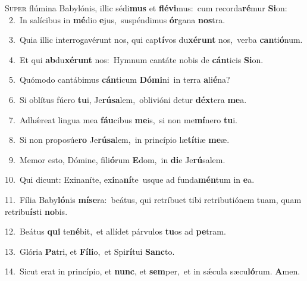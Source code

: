 \lettrine{\initial\textcolor{\initialcolor}{S}}{uper} flúmina Babylónis, illic sédi\textbf{mus} et \textbf{flé}\-\textbf{vi}mus:~\star cum recorda\-\textbf{ré}\-mur \textbf{Si}\-on:\\
{\numbfont\textcolor{\numbcolor}{~2.}}~In salícibus in \textbf{mé}\-dio \textbf{e}\-jus,~\star suspéndimus \textbf{ór}\-gana \textbf{nos}\-tra.\par
{\numbfont\textcolor{\numbcolor}{~3.}}~Quia illic interrogavérunt nos, qui cap\-\textbf{tí}\-vos du\-\textbf{xé}\-\textbf{runt} nos,~\star verba \textbf{can}\-ti\-\textbf{ó}\-num.\par
{\numbfont\textcolor{\numbcolor}{~4.}}~Et qui \textbf{ab}\-du\-\textbf{xé}\-\textbf{runt} nos:~\star Hymnum cantáte nobis de \textbf{cán}\-ticis \textbf{Si}\-on.\par
{\numbfont\textcolor{\numbcolor}{~5.}}~Quómodo cantábimus \textbf{cán}\-ticum \textbf{Dó}\-\textbf{mi}ni~\star in terra \textbf{a}\-li\-\textbf{é}\-na?\par
{\numbfont\textcolor{\numbcolor}{~6.}}~Si oblítus fúero \textbf{tu}\-i, Je\-\textbf{rú}\-\textbf{sa}lem,~\star oblivióni detur \textbf{déx}\-tera \textbf{me}\-a.\par
{\numbfont\textcolor{\numbcolor}{~7.}}~Adhǽreat lingua mea \textbf{fáu}\-cibus \textbf{me}\-is,~\star si non me\-\textbf{mí}\-nero \textbf{tu}\-i.\par
{\numbfont\textcolor{\numbcolor}{~8.}}~Si non proposúe\textbf{ro} Je\-\textbf{rú}\-\textbf{sa}lem,~\star in princípio læ\-\textbf{tí}\-tiæ \textbf{me}\-æ.\par
{\numbfont\textcolor{\numbcolor}{~9.}}~Memor esto, Dómine, fili\-\textbf{ó}\-rum \textbf{E}\-dom,~\star in \textbf{di}\-e Je\-\textbf{rú}\-salem.\par
{\numbfont\textcolor{\numbcolor}{10.}}~Qui dicunt: Exinaníte, ex\-\textbf{i}\-na\-\textbf{ní}\-te~\star usque ad funda\-\textbf{mén}\-tum in \textbf{e}\-a.\par
{\numbfont\textcolor{\numbcolor}{11.}}~Fília Baby\-\textbf{ló}\-nis \textbf{mí}\-\textbf{se}ra:~\star beátus, qui retríbuet tibi retributiónem tuam, quam retribu\-\textbf{ís}\-ti \textbf{no}\-bis.\par
{\numbfont\textcolor{\numbcolor}{12.}}~Beátus \textbf{qui} te\-\textbf{né}\-bit,~\star et allídet párvulos \textbf{tu}\-os ad \textbf{pe}\-tram.\par
{\numbfont\textcolor{\numbcolor}{13.}}~Glória \textbf{Pa}\-tri, et \textbf{Fí}\-\textbf{li}o,~\star et Spi\-\textbf{rí}\-tui \textbf{Sanc}\-to.\par
{\numbfont\textcolor{\numbcolor}{14.}}~Sicut erat in princípio, et \textbf{nunc}\-, et \textbf{sem}\-per,~\star et in sǽcula sæcu\-\textbf{ló}\-rum. \textbf{A}\-men.\par
